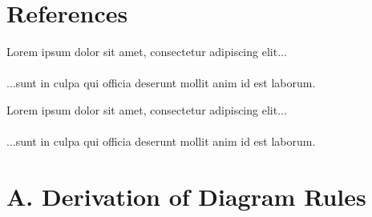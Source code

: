 \documentclass{article}
\newcommand{\lorem}[1]{
    Lorem ipsum dolor sit amet, consectetur adipiscing elit...\\
    \nopagebreak\vspace{#1cm} \ \\
    ...sunt in culpa qui officia deserunt mollit anim id est laborum.
}
\begin{document}

\section*{References}
    
    

    \lorem{5}
    \lorem{5}


\section*{A. Derivation of Diagram Rules}
\end{document}
